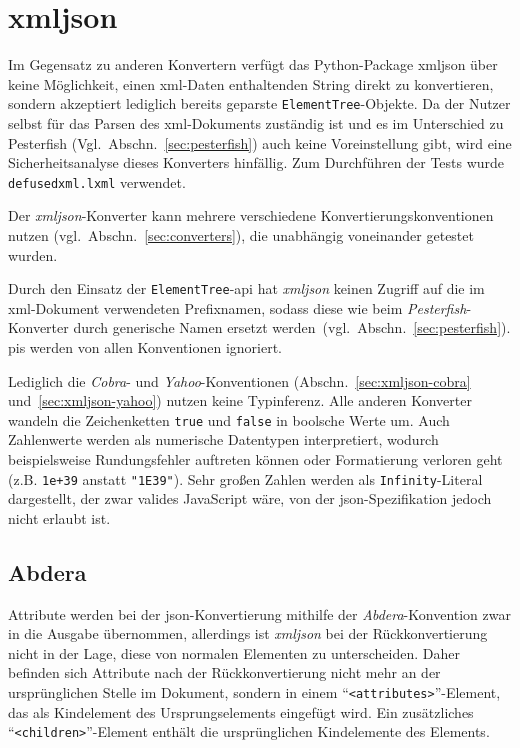 \section{xmljson}
\label{sec:xmljson}

Im Gegensatz zu anderen Konvertern verfügt das Python-Package xmljson über keine Möglichkeit, einen \acrshort{xml}-Daten enthaltenden String direkt zu konvertieren, sondern akzeptiert lediglich bereits geparste \texttt{ElementTree}-Objekte. Da der Nutzer selbst für das Parsen des \acrshort{xml}-Dokuments zuständig ist und es im Unterschied zu Pesterfish (Vgl.~Abschn.~\ref{sec:pesterfish}) auch keine Voreinstellung gibt, wird eine Sicherheitsanalyse dieses Konverters hinfällig. Zum Durchführen der Tests wurde \texttt{defusedxml.lxml} verwendet.

Der \emph{xmljson}-Konverter kann mehrere verschiedene Konvertierungskonventionen nutzen (vgl.~Abschn.~\ref{sec:converters}), die unabhängig voneinander getestet wurden.

Durch den Einsatz der \texttt{ElementTree}-\acrshort{api} hat \emph{xmljson} keinen Zugriff auf die im \acrshort{xml}-Dokument verwendeten Prefixnamen, sodass diese wie beim \emph{Pesterfish}-Konverter durch generische Namen ersetzt werden~(vgl.~Abschn.~\ref{sec:pesterfish}).
\glspl{pi} werden von allen Konventionen ignoriert.

Lediglich die \emph{Cobra}- und \emph{Yahoo}-Konventionen (Abschn.~\ref{sec:xmljson-cobra} und~\ref{sec:xmljson-yahoo}) nutzen keine Typinferenz. Alle anderen Konverter wandeln die Zeichenketten \texttt{true} und \texttt{false} in boolsche Werte um. Auch Zahlenwerte werden als numerische Datentypen interpretiert, wodurch beispielsweise Rundungsfehler auftreten können oder Formatierung verloren geht (z.B. \texttt{1e+39} anstatt \texttt{"1E39"}). Sehr großen Zahlen werden als \texttt{Infinity}-Literal dargestellt, der zwar valides JavaScript wäre, von der \acrshort{json}-Spezifikation jedoch nicht erlaubt ist.

\subsection{Abdera}
\label{sec:xmljson-abdera}

Attribute werden bei der \acrshort{json}-Konvertierung mithilfe der \emph{Abdera}-Konvention zwar in die Ausgabe übernommen, allerdings ist \emph{xmljson} bei der Rückkonvertierung nicht in der Lage, diese von normalen Elementen zu unterscheiden. Daher befinden sich Attribute nach der Rückkonvertierung nicht mehr an der ursprünglichen Stelle im Dokument, sondern in einem \enquote{\texttt{<attributes>}}-Element, das als Kindelement des Ursprungselements eingefügt wird. Ein zusätzliches \enquote{\texttt{<children>}}-Element enthält die ursprünglichen Kindelemente des Elements.


